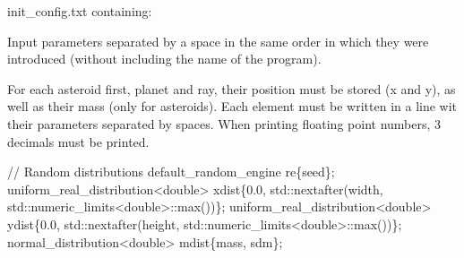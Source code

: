 {\ttfamily init\+\_\+config.\+txt} containing\+:


\begin{DoxyItemize}
\item Input parameters separated by a space in the same order in which they were introduced (without including the name of the program).
\item For each asteroid first, planet and ray, their position must be stored (x and y), as well as their mass (only for asteroids). Each element must be written in a line wit their parameters separated by spaces. When printing floating point numbers, 3 decimals must be printed.
\end{DoxyItemize}


\begin{DoxyCode}
\textcolor{comment}{// Random distributions}
default\_random\_engine re\{seed\};
uniform\_real\_distribution<double> xdist\{0.0, std::nextafter(width, std::numeric\_limits<double>::max())\};
uniform\_real\_distribution<double> ydist\{0.0, std::nextafter(height, std::numeric\_limits<double>::max())\};
normal\_distribution<double> mdist\{mass, sdm\};
\end{DoxyCode}
 